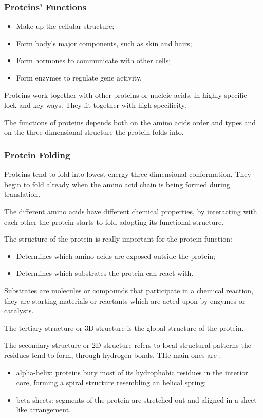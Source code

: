 \subsubsection{Proteins' Functions}
\begin{itemize}
	\item Make up the cellular structure;
	\item Form body's major components, such as skin and hairs;
	\item Form hormones to communicate with other cells;
	\item Form enzymes to regulate gene activity.
\end{itemize}

Proteins work together with other proteins or nucleic acids, in highly specific lock-and-key ways. They fit together with high specificity.

The functions of proteins depends both on the amino acids order and types and on the three-dimensional structure the protein folds into.

\subsubsection{Protein Folding}
Proteins tend to fold into lowest energy three-dimensional conformation. They begin to fold already when the amino acid chain is being formed during translation.

The different amino acids have different chemical properties, by interacting with each other the protein starts to fold adopting its functional structure.

The structure of the protein is really important for the protein function:
\begin{itemize}
	\item Determines which amino acids are exposed outside the protein;
	\item Determines which substrates the protein can react with.
\end{itemize}

Substrates are molecules or compounds that participate in a chemical reaction, they are starting materials or reactants which are acted upon by enzymes or catalysts.

The tertiary structure or 3D structure is the global structure of the protein.

The secondary structure or 2D structure refers to local structural patterns the residues tend to form, through hydrogen bonds. THe main ones are :
\begin{itemize}
	\item alpha-helix: proteins bury most of its hydrophobic residues in the interior core, forming a spiral structure resembling an helical spring;
	\item beta-sheets: segments of the protein are stretched out and aligned in a sheet-like arrangement.
\end{itemize}
